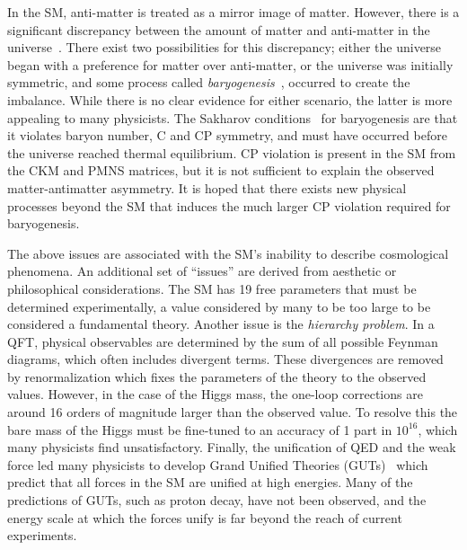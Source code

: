In the SM, anti-matter is treated as a mirror image of matter.
However, there is a significant discrepancy between the amount of matter and anti-matter in the universe~\cite{AlexDM1, AlexDM2}.
There exist two possibilities for this discrepancy; either the universe began with a preference for matter over anti-matter, or the universe was initially symmetric, and some process called \textit{baryogenesis}~\cite{BaryosynthesisOriginGalaxies}, occurred to create the imbalance.
While there is no clear evidence for either scenario, the latter is more appealing to many physicists.
The Sakharov conditions~\cite{Sakharov1967} for baryogenesis are that it violates baryon number, C and CP symmetry, and must have occurred before the universe reached thermal equilibrium.
CP violation is present in the SM from the CKM and PMNS matrices, but it is not sufficient to explain the observed matter-antimatter asymmetry.
It is hoped that there exists new physical processes beyond the SM that induces the much larger CP violation required for baryogenesis.

The above issues are associated with the SM's inability to describe cosmological phenomena.
An additional set of ``issues'' are derived from aesthetic or philosophical considerations.
The SM has 19 free parameters that must be determined experimentally, a value considered by many to be too large to be considered a fundamental theory.
Another issue is the \textit{hierarchy problem}.
In a QFT, physical observables are determined by the sum of all possible Feynman diagrams, which often includes divergent terms.
These divergences are removed by renormalization which fixes the parameters of the theory to the observed values.
However, in the case of the Higgs mass, the one-loop corrections are around 16 orders of magnitude larger than the observed value.
To resolve this the bare mass of the Higgs must be fine-tuned to an accuracy of 1 part in $10^{16}$, which many physicists find unsatisfactory.
Finally, the unification of QED and the weak force led many physicists to develop Grand Unified Theories (GUTs)~\cite{GUT1, GUT2} which predict that all forces in the SM are unified at high energies.
Many of the predictions of GUTs, such as proton decay, have not been observed, and the energy scale at which the forces unify is far beyond the reach of current experiments.
